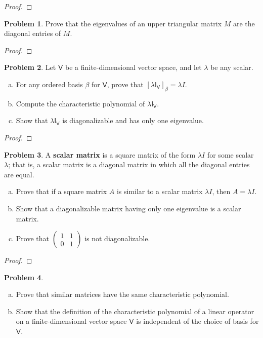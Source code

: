\documentclass[12pt]{book}
\theoremstyle{definition}
\newtheorem{problem}{Problem}
\begin{document}
	\begin{proof}
	\end{proof}
	\newpage
	\begin{problem}
		Prove that the eigenvalues of an upper triangular matrix $M$ are the diagonal entries of $M$.
	\end{problem}
	\begin{proof}
	\end{proof}
	\newpage
	\begin{problem}
		Let $\mathsf{V}$ be a finite-dimensional vector space, and let $\lambda$ be any scalar.
		\begin{enumerate}[(a)]
			\item For any ordered basis $\beta$ for $\mathsf{V}$, prove that $[\lambda\mathsf{I}_\mathsf{V}]_\beta=\lambda I$.
			\item Compute the characteristic polynomial of $\lambda\mathsf{I}_\mathsf{V}$.
			\item Show that $\lambda\mathsf{I}_\mathsf{V}$ is diagonalizable and has only one eigenvalue.
		\end{enumerate}
	\end{problem}
	\begin{proof}
	\end{proof}
	\newpage
	\begin{problem}
		A \textbf{scalar matrix} is a square matrix of the form $\lambda I$ for some scalar $\lambda$; that is, a scalar matrix is a diagonal matrix in which all the diagonal entries are equal.
		\begin{enumerate}[(a)]
			\item Prove that if a square matrix $A$ is similar to a scalar matrix $\lambda I$, then $A=\lambda I$.
			\item Show that a diagonalizable matrix having only one eigenvalue is a scalar matrix.
			\item Prove that $\begin{pmatrix}
				1&1\\
				0&1
			\end{pmatrix}$ is not diagonalizable.
		\end{enumerate}
	\end{problem}
	\begin{proof}
	\end{proof}
	\newpage
	\begin{problem} $\mathit{}$
		\begin{enumerate}[(a)]
			\item Prove that similar matrices have the same characteristic polynomial.
			\item Show that the definition of the characteristic polynomial of a linear operator on a finite-dimensional vector space $\mathsf{V}$ is independent of the choice of basis for $\mathsf{V}$.
		\end{enumerate}
	\end{problem}
\end{document}
